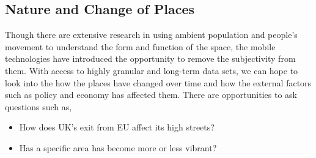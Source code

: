 \subsection{Nature and Change of Places}

Though there are extensive research in using ambient population and people's movement to understand the form and function of the space, the mobile technologies have introduced the opportunity to remove the subjectivity from them.
With access to highly granular and long-term data sets, we can hope to look into the how the places have changed over time and how the external factors such as policy and economy has affected them.
There are opportunities to ask questions such as,

\begin{itemize}
  \itemsep-0.25em
  \item How does UK's exit from EU affect its high streets?
  \item Has a specific area has become more or less vibrant?
\end{itemize}







